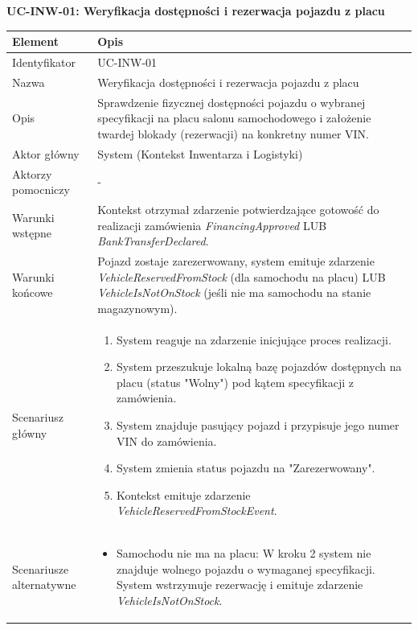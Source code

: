 \textbf{UC-INW-01: Weryfikacja dostępności i rezerwacja pojazdu z placu}

\begin{longtable}{|p{4cm}|p{11cm}|}
\hline
\textbf{Element} & \textbf{Opis} \\
\hline

Identyfikator & UC-INW-01 \\
\hline

Nazwa & Weryfikacja dostępności i rezerwacja pojazdu z placu \\
\hline

Opis & 
Sprawdzenie fizycznej dostępności pojazdu o wybranej specyfikacji na placu salonu samochodowego i założenie twardej blokady (rezerwacji) na konkretny numer VIN. \\
\hline

Aktor główny & System (Kontekst Inwentarza i Logistyki) \\
\hline

Aktorzy pomocniczy & - \\
\hline

Warunki wstępne & 
Kontekst otrzymał zdarzenie potwierdzające gotowość do realizacji zamówienia \textit{FinancingApproved} LUB \textit{BankTransferDeclared}. \\
\hline

Warunki końcowe & 
Pojazd zostaje zarezerwowany, system emituje zdarzenie \textit{VehicleReservedFromStock} (dla samochodu na placu) LUB \textit{VehicleIsNotOnStock} (jeśli nie ma samochodu na stanie magazynowym). \\
\hline

Scenariusz główny & 
\begin{enumerate}
    \item System reaguje na zdarzenie inicjujące proces realizacji.
    \item System przeszukuje lokalną bazę pojazdów dostępnych na placu (status "Wolny") pod kątem specyfikacji z zamówienia.
    \item System znajduje pasujący pojazd i przypisuje jego numer VIN do zamówienia.
    \item System zmienia status pojazdu na "Zarezerwowany".
    \item Kontekst emituje zdarzenie \textit{VehicleReservedFromStockEvent}.
\end{enumerate} \\
\hline

Scenariusze alternatywne & 
\begin{itemize}
    \item [A1] Samochodu nie ma na placu: W kroku 2 system nie znajduje wolnego pojazdu o wymaganej specyfikacji. System wstrzymuje rezerwację i emituje zdarzenie \textit{VehicleIsNotOnStock}.
\end{itemize} \\
\hline
\end{longtable}

